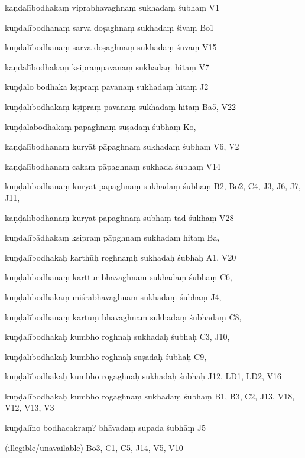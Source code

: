 \begin{ekdosis}
\begin{marma}[hp01_055]
\begin{marma}[hp02_009]
\begin{marma}[hp02_011]
      \begin{marma}[hp02_67ab]
      \item[kaṇdalībodhakaṃ viprabhavaghnaṃ sukhadaṃ śubhaṃ] V1
      \item[kuṇdalībodhanaṃ sarva doṣaghnaṃ sukhadaṃ śivaṃ] Bo1
      \item[kuṇdalībodhanaṃ sarva doṣaghnaṃ sukhadaṃ śuvaṃ] V15
      \item[kaṇdalībodhakaṃ ksipraṃpavanaṃ sukhadaṃ hitaṃ] V7
      \item[kuṇḍalo bodhaka kṣipraṃ pavanaṃ sukhadaṃ hitaṃ] J2
      \item[kuṇḍalībodhakaṃ kṣipraṃ pavanaṃ sukhadaṃ hitaṃ] Ba5, V22
      \item[kuṇḍalabodhakaṃ pāpāghnaṃ suṣadaṃ śubhaṃ] Ko,
      \item[kaṇḍalībodhanaṃ kuryāt pāpaghnaṃ sukhadaṃ śubhaṃ] V6, V2
      \item[kaṇḍalībodhanaṃ cakaṃ pāpaghnaṃ sukhada śubhaṃ] V14
      \item[kuṇḍalībodhanaṃ kuryāt pāpaghnaṃ sukhadaṃ śubhaṃ] B2, Bo2, C4, J3, J6, J7, J11,  
      \item[kaṇḍalībodhanaṃ kuryāt pāpaghnaṃ subhaṃ tad śukhaṃ] V28
      \item[kuṇdalībādhakaṃ ksipraṃ pāpghnaṃ sukhadaṃ hitaṃ] Ba, 
      \item[kuṇḍalībodhakaḥ karthūḥ roghnaṃḥ sukhadaḥ śubhaḥ] A1, V20
      \item[kuṇḍalībodhanaṃ karttur bhavaghnam sukhadaṃ śubhaṃ] C6,
      \item[kuṇḍalībodhakaṃ miśrabhavaghnam sukhadaṃ śubhaṃ] J4,
      \item[kuṇḍalībodhanaṃ kartuṃ bhavaghnam sukhadaṃ śubhadaṃ] C8,
      \item[kuṇḍalībodhakaḥ kumbho roghnaḥ sukhadaḥ śubhaḥ] C3, J10,  
      \item[kuṇḍalībodhakaḥ kumbho roghnaḥ suṣadaḥ śubhaḥ] C9, 
      \item[kuṇḍalībodhakaḥ kumbho rogaghnaḥ sukhadaḥ śubhaḥ] J12, LD1, LD2, V16 
      \item[kuṇḍalībodhakaḥ kumbho rogaghnaṃ sukhadaṃ śubhaṃ] B1, B3, C2, J13, V18, V12, V13, V3 
      \item[kuṇḍalīno bodhacakraṃ? bhāvadaṃ supada śubhāṃ] J5
      \item[(illegible/unavailable)] Bo3, C1, C5, J14, V5, V10
        \begin{description}


\end{description}
\end{marma}
\end{marma}
\end{marma}
\end{marma}
\end{ekdosis}
